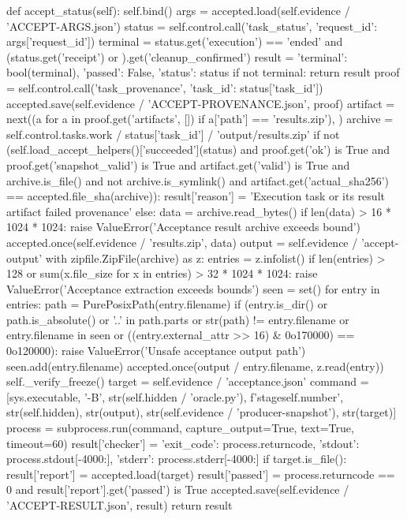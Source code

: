     def accept_status(self):
        self.bind()
        args = accepted.load(self.evidence / 'ACCEPT-ARGS.json')
        status = self.control.call('task_status', {'request_id': args['request_id']})
        terminal = status.get('execution') == 'ended' and (status.get('receipt') or {}).get('cleanup_confirmed')
        result = {'terminal': bool(terminal), 'passed': False, 'status': status}
        if not terminal:
            return result
        proof = self.control.call('task_provenance', {'task_id': status['task_id']})
        accepted.save(self.evidence / 'ACCEPT-PROVENANCE.json', proof)
        artifact = next((a for a in proof.get('artifacts', []) if a['path'] == 'results.zip'), {})
        archive = self.control.tasks.work / status['task_id'] / 'output/results.zip'
        if not (self.load_accept_helpers()['succeeded'](status) and proof.get('ok') is True
                and proof.get('snapshot_valid') is True and artifact.get('valid') is True
                and archive.is_file() and not archive.is_symlink() and artifact.get('actual_sha256') == accepted.file_sha(archive)):
            result['reason'] = 'Execution task or its result artifact failed provenance'
        else:
            data = archive.read_bytes()
            if len(data) > 16 * 1024 * 1024:
                raise ValueError('Acceptance result archive exceeds bound')
            accepted.once(self.evidence / 'results.zip', data)
            output = self.evidence / 'accept-output'
            with zipfile.ZipFile(archive) as z:
                entries = z.infolist()
                if len(entries) > 128 or sum(x.file_size for x in entries) > 32 * 1024 * 1024:
                    raise ValueError('Acceptance extraction exceeds bounds')
                seen = set()
                for entry in entries:
                    path = PurePosixPath(entry.filename)
                    if (entry.is_dir() or path.is_absolute() or '..' in path.parts or str(path) != entry.filename
                            or entry.filename in seen or ((entry.external_attr >> 16) & 0o170000) == 0o120000):
                        raise ValueError('Unsafe acceptance output path')
                    seen.add(entry.filename)
                    accepted.once(output / entry.filename, z.read(entry))
            self._verify_freeze()
            target = self.evidence / 'acceptance.json'
            command = [sys.executable, '-B', str(self.hidden / 'oracle.py'), f'stage{self.number}',
                       str(self.hidden), str(output), str(self.evidence / 'producer-snapshot'), str(target)]
            process = subprocess.run(command, capture_output=True, text=True, timeout=60)
            result['checker'] = {'exit_code': process.returncode, 'stdout': process.stdout[-4000:], 'stderr': process.stderr[-4000:]}
            if target.is_file():
                result['report'] = accepted.load(target)
                result['passed'] = process.returncode == 0 and result['report'].get('passed') is True
        accepted.save(self.evidence / 'ACCEPT-RESULT.json', result)
        return result


